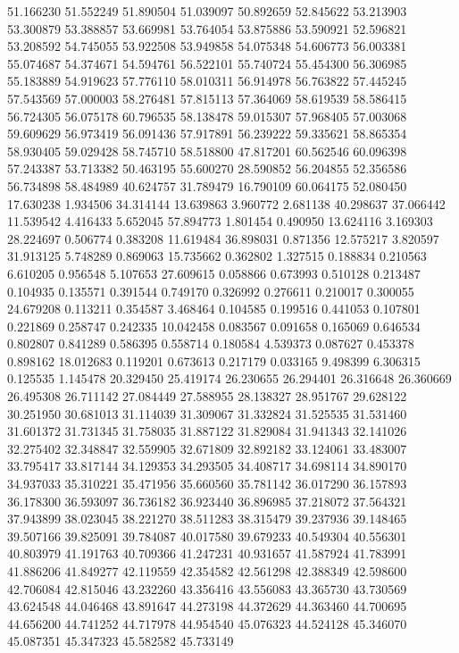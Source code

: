 51.166230
51.552249
51.890504
51.039097
50.892659
52.845622
53.213903
53.300879
53.388857
53.669981
53.764054
53.875886
53.590921
52.596821
53.208592
54.745055
53.922508
53.949858
54.075348
54.606773
56.003381
55.074687
54.374671
54.594761
56.522101
55.740724
55.454300
56.306985
55.183889
54.919623
57.776110
58.010311
56.914978
56.763822
57.445245
57.543569
57.000003
58.276481
57.815113
57.364069
58.619539
58.586415
56.724305
56.075178
60.796535
58.138478
59.015307
57.968405
57.003068
59.609629
56.973419
56.091436
57.917891
56.239222
59.335621
58.865354
58.930405
59.029428
58.745710
58.518800
47.817201
60.562546
60.096398
57.243387
53.713382
50.463195
55.600270
28.590852
56.204855
52.356586
56.734898
58.484989
40.624757
31.789479
16.790109
60.064175
52.080450
17.630238
1.934506
34.314144
13.639863
3.960772
2.681138
40.298637
37.066442
11.539542
4.416433
5.652045
57.894773
1.801454
0.490950
13.624116
3.169303
28.224697
0.506774
0.383208
11.619484
36.898031
0.871356
12.575217
3.820597
31.913125
5.748289
0.869063
15.735662
0.362802
1.327515
0.188834
0.210563
6.610205
0.956548
5.107653
27.609615
0.058866
0.673993
0.510128
0.213487
0.104935
0.135571
0.391544
0.749170
0.326992
0.276611
0.210017
0.300055
24.679208
0.113211
0.354587
3.468464
0.104585
0.199516
0.441053
0.107801
0.221869
0.258747
0.242335
10.042458
0.083567
0.091658
0.165069
0.646534
0.802807
0.841289
0.586395
0.558714
0.180584
4.539373
0.087627
0.453378
0.898162
18.012683
0.119201
0.673613
0.217179
0.033165
9.498399
6.306315
0.125535
1.145478
20.329450
25.419174
26.230655
26.294401
26.316648
26.360669
26.495308
26.711142
27.084449
27.588955
28.138327
28.951767
29.628122
30.251950
30.681013
31.114039
31.309067
31.332824
31.525535
31.531460
31.601372
31.731345
31.758035
31.887122
31.829084
31.941343
32.141026
32.275402
32.348847
32.559905
32.671809
32.892182
33.124061
33.483007
33.795417
33.817144
34.129353
34.293505
34.408717
34.698114
34.890170
34.937033
35.310221
35.471956
35.660560
35.781142
36.017290
36.157893
36.178300
36.593097
36.736182
36.923440
36.896985
37.218072
37.564321
37.943899
38.023045
38.221270
38.511283
38.315479
39.237936
39.148465
39.507166
39.825091
39.784087
40.017580
39.679233
40.549304
40.556301
40.803979
41.191763
40.709366
41.247231
40.931657
41.587924
41.783991
41.886206
41.849277
42.119559
42.354582
42.561298
42.388349
42.598600
42.706084
42.815046
43.232260
43.356416
43.556083
43.365730
43.730569
43.624548
44.046468
43.891647
44.273198
44.372629
44.363460
44.700695
44.656200
44.741252
44.717978
44.954540
45.076323
44.524128
45.346070
45.087351
45.347323
45.582582
45.733149
